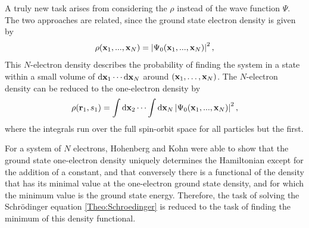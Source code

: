 \documentclass[8.5pt,twoside,twocolumn]{article}
\newcommand\di{\te{d}}
\renewcommand\r{\bo r}
\theoremstyle{standard}
\begin{document}
A truly new task arises from considering the  $\rho$ instead of the wave function
$\Psi$. The two approaches are related, since the ground state electron density is given by
\begin{equation}
 \rho(\mathbf{x}_1,...,\mathbf{x}_N)=\left|{\Psi_0(\mathbf{x}_1,...,\mathbf{x}_N)}\right|^2,
 \label{Theo:NElectronDensity}
\end{equation}
This $N$-electron density describes the probability of finding the system in a state within 
a small volume of $\di \x_1 \cdots \di \x_N$ around $(\mathbf{x}_1,\ldots,\mathbf{x}_N)$. 
The $N$-electron density can be reduced to the one-electron density by
\begin{equation}
 \rho(\r_1,s_1)=\int\di\x_2 \cdots \int\di \x_N \abs{\Psi_0(\x_1,...,\x_N)}^2,
 \label{Theo:1ElectronDensity}
\end{equation}
where the integrals run over %
the full spin-orbit space for all particles but the first.

For a system of $N$ electrons, Hohenberg and Kohn \cite{HohenbergKohn} were able to show that the ground state
one-electron density uniquely determines the Hamiltonian except for the addition of a constant,
and that conversely there is a functional of the density that has its minimal value at the one-electron
ground state density, and for which the minimum value is the ground state energy. Therefore, the task
of solving the Schrödinger equation \eqref{Theo:Schroedinger} is reduced to the task of finding
the minimum of this density functional.
\end{document}

